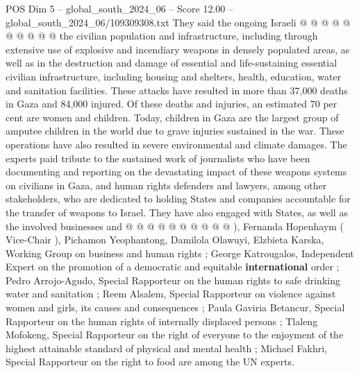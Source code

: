 \begin{textsample}{POS Dim 5 – global\_south\_2024\_06 – Score 12.00 – global\_south\_2024\_06/109309308.txt}
They said the ongoing Israeli @ @ @ @ @ @ @ @ @ @ the civilian population and infrastructure, including through extensive use of explosive and incendiary weapons in densely populated areas, as well as in the destruction and damage of essential and life-sustaining essential civilian infrastructure, including housing and shelters, health, education, water and sanitation facilities.
These attacks have resulted in more than 37,000 deaths in Gaza and 84,000 injured.
Of these deaths and injuries, an estimated 70 per cent are women and children.
Today, children in Gaza are the largest group of amputee children in the world due to grave injuries sustained in the war.
These operations have also resulted in severe environmental and climate damages.
The experts paid tribute to the sustained work of journalists who have been documenting and reporting on the devastating impact of these weapons systems on civilians in Gaza, and human rights defenders and lawyers, among other stakeholders, who are dedicated to holding States and companies accountable for the transfer of weapons to Israel.
They have also engaged with States, as well as the involved businesses and @ @ @ @ @ @ @ @ @ @ ), Fernanda Hopenhaym ( Vice-Chair ), Pichamon Yeophantong, Damilola Olawuyi, Elzbieta Karska, Working Group on business and human rights ; George Katrougalos, Independent Expert on the promotion of a democratic and equitable \textbf{international} order ; Pedro Arrojo-Agudo, Special Rapporteur on the human rights to safe drinking water and sanitation ; Reem Alsalem, Special Rapporteur on violence against women and girls, its causes and consequences ; Paula Gaviria Betancur, Special Rapporteur on the human rights of internally displaced persons ; Tlaleng Mofokeng, Special Rapporteur on the right of everyone to the enjoyment of the highest attainable standard of physical and mental health ; Michael Fakhri, Special Rapporteur on the right to food are among the UN experts.

\end{textsample}

